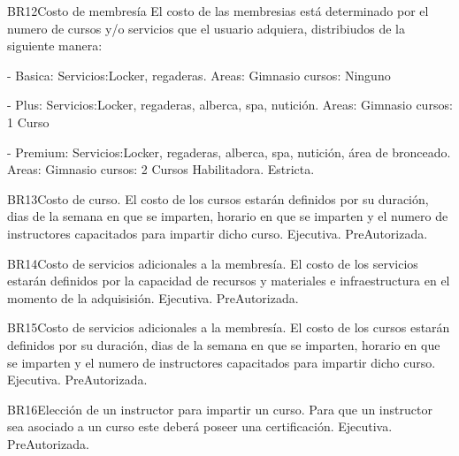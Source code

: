 \begin{BussinesRule}{BR12}{Costo de membresía}
	\BRitem[Descripción:] El costo de las membresias está determinado por el numero de cursos y/o servicios que el usuario adquiera, distribiudos de la siguiente manera:

- Basica: 
		Servicios:Locker, regaderas.			
			Areas: Gimnasio
			cursos: Ninguno

- Plus: 
		Servicios:Locker, regaderas, alberca, spa, nutición.
			Areas: Gimnasio
			cursos: 1 Curso

- Premium: 
		Servicios:Locker, regaderas, alberca, spa, nutición, área de bronceado.
			Areas: Gimnasio
			cursos: 2 Cursos
	\BRitem[Tipo:] Habilitadora.
	\BRitem[Nivel:] Estricta.
\end{BussinesRule}

\begin{BussinesRule}{BR13}{Costo de curso.} 
	\BRitem[Descripción:] El costo de los cursos estarán definidos por su duración, dias de la semana en que se imparten, horario en que se imparten y el numero de instructores capacitados para impartir dicho curso.
	\BRitem[Tipo:] Ejecutiva.
	\BRitem[Nivel:] PreAutorizada.
\end{BussinesRule}

\begin{BussinesRule}{BR14}{Costo de servicios adicionales a la membresía.} 
	\BRitem[Descripción:] El costo de los servicios estarán definidos por la capacidad de recursos y materiales e infraestructura en el momento de la adquisisión.
	\BRitem[Tipo:] Ejecutiva.
	\BRitem[Nivel:] PreAutorizada.
\end{BussinesRule}

\begin{BussinesRule}{BR15}{Costo de servicios adicionales a la membresía.} 
	\BRitem[Descripción:] El costo de los cursos estarán definidos por su duración, dias de la semana en que se imparten, horario en que se imparten y el numero de instructores capacitados para impartir dicho curso.
	\BRitem[Tipo:] Ejecutiva.
	\BRitem[Nivel:] PreAutorizada.
\end{BussinesRule}

\begin{BussinesRule}{BR16}{Elección de un instructor para impartir un curso.} 
	\BRitem[Descripción:] Para que un instructor sea asociado a un curso este deberá poseer una certificación.
	\BRitem[Tipo:] Ejecutiva.
	\BRitem[Nivel:] PreAutorizada.
\end{BussinesRule}

